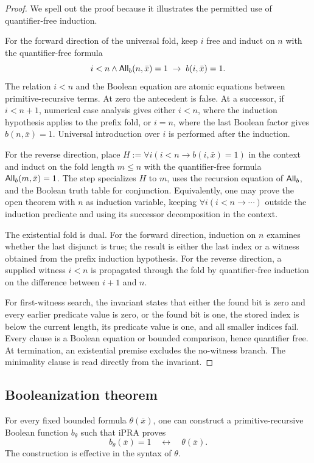 \begin{proof}
We spell out the proof because it illustrates the permitted use of
quantifier-free induction.

For the forward direction of the universal fold, keep \(i\) free and induct on
\(n\) with the quantifier-free formula
\[
  i<n\wedge \mathsf{All}_b(n,\bar x)=1\;\to\;b(i,\bar x)=1.
\]
The relation \(i<n\) and the Boolean equation are atomic equations between
primitive-recursive terms.  At zero the antecedent is false.  At a successor,
if \(i<n+1\), numerical case analysis gives either \(i<n\), where the induction
hypothesis applies to the prefix fold, or \(i=n\), where the last Boolean
factor gives \(b(n,\bar x)=1\).  Universal introduction over \(i\) is performed
after the induction.

For the reverse direction, place
\(H:=\forall i(i<n\to b(i,\bar x)=1)\) in the context and induct on the fold
length \(m\le n\) with the quantifier-free formula
\(\mathsf{All}_b(m,\bar x)=1\).  The step specializes \(H\) to \(m\), uses the
recursion equation of \(\mathsf{All}_b\), and the Boolean truth table for conjunction.
Equivalently, one may prove the open theorem with \(n\) as induction variable,
keeping \(\forall i(i<n\to\cdots)\) outside the induction predicate and using
its successor decomposition in the context.

The existential fold is dual.  For the forward direction, induction on \(n\)
examines whether the last disjunct is true; the result is either the last index
or a witness obtained from the prefix induction hypothesis.  For the reverse
direction, a supplied witness \(i<n\) is propagated through the fold by
quantifier-free induction on the difference between \(i+1\) and \(n\).

For first-witness search, the invariant states that either the found bit is
zero and every earlier predicate value is zero, or the found bit is one, the
stored index is below the current length, its predicate value is one, and all
smaller indices fail.  Every clause is a Boolean equation or bounded
comparison, hence quantifier free.  At termination, an existential premise
excludes the no-witness branch.  The minimality clause is read directly from
the invariant.
\end{proof}

\subsection{Booleanization theorem}

\begin{theorem}
\label{thm:booleanization}
For every fixed bounded formula \(\theta(\bar x)\), one can construct a
primitive-recursive Boolean function \(b_\theta\) such that iPRA proves
\[
  b_\theta(\bar x)=1\quad\leftrightarrow\quad\theta(\bar x).
\]
The construction is effective in the syntax of \(\theta\).
\end{theorem}

